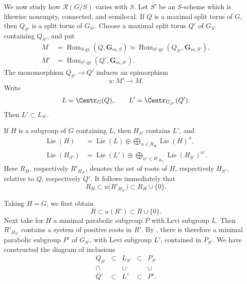 
We now study how \(\mathcal R(G/S)\) varies with \(S\).  Let \(S'\)
be an \(S\)-scheme which is likewise nonempty, connected, and
semilocal.  If \(Q\) is a maximal split torus of \(G\), then
\(Q_{S'}\) is a split torus of \(G_{S'}\).  Choose a maximal split
torus \(Q'\) of \(G_{S'}\) containing \(Q_{S'}\), and put
\[
\begin{aligned}
 M&=\operatorname{Hom}_{S\text{-}\mathrm{gr}}
       (Q,\mathbf G_{m,S})
   \simeq
   \operatorname{Hom}_{S'\text{-}\mathrm{gr}}
       (Q_{S'},\mathbf G_{m,S'}),\\
 M'&=\operatorname{Hom}_{S'\text{-}\mathrm{gr}}
       (Q',\mathbf G_{m,S'}).
\end{aligned}
\]
The monomorphism \(Q_{S'}\to Q'\) induces an epimorphism
\[
 u:M'\longrightarrow M.
\]
Write
\[
 L=\Centr_G(Q),\qquad L'=\Centr_{G_{S'}}(Q').
\]
Then \(L'\subset L_{S'}\).

If \(H\) is a subgroup of \(G\) containing \(L\), then \(H_{S'}\)
contains \(L'\), and
\[
\begin{aligned}
 \operatorname{Lie}(H)
  &=\operatorname{Lie}(L)
    \oplus\bigoplus_{\alpha\in R_H}
       \operatorname{Lie}(H)^\alpha,\\
 \operatorname{Lie}(H_{S'})
  &=\operatorname{Lie}(L')
    \oplus\bigoplus_{\alpha'\in R'_{H_{S'}}}
       \operatorname{Lie}(H_{S'})^{\alpha'}.
\end{aligned}
\]
Here \(R_H\), respectively \(R'_{H_{S'}}\), denotes the set of
roots of \(H\), respectively \(H_{S'}\), relative to \(Q\),
respectively \(Q'\).  It follows immediately that
\[
 R_H\subset u\bigl(R'_{H_{S'}}\bigr)
       \subset R_H\cup\{0\}.
\]

Taking \(H=G\), we first obtain
\[
 R\subset u(R')\subset R\cup\{0\}.
\]
Next take for \(H\) a minimal parabolic subgroup \(P\) with Levi
subgroup \(L\).  Then \(R'_{H_{S'}}\) contains a system of positive
roots in \(R'\).  By , there is therefore a minimal parabolic
subgroup \(P'\) of \(G_{S'}\), with Levi subgroup \(L'\), contained
in \(P_{S'}\).  We have constructed the diagram of inclusions
\[
\begin{array}{ccccc}
 Q_{S'} & \subset & L_{S'} & \subset & P_{S'}\\[1.2ex]
 \cap   &         & \cup   &         & \cup\\[1.2ex]
 Q'     & \subset & L'     & \subset & P'.
\end{array}
\]

